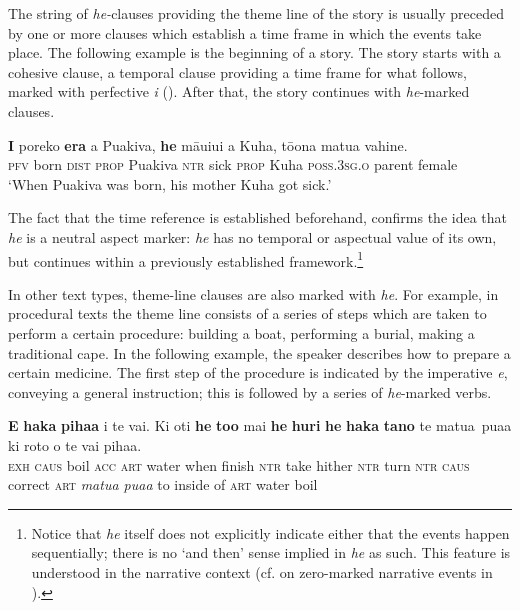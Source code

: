 The string of \textit{he-}clauses providing the theme line of the story is usually preceded by one or more clauses which establish a time frame in which the events take place. The following example is the beginning of a story. The story starts with a cohesive clause, a temporal clause providing a time frame for what follows, marked with perfective \textit{i} (). After that, the story continues with \textit{he}{}-marked clauses.

\ea\label{ex:7.4}
\gll \textbf{I} poreko \textbf{era} a Puakiva, \textbf{he} māuiui a Kuha, tō{\ꞌ}ona matu{\ꞌ}a vahine. \\
\textsc{pfv} born \textsc{dist} \textsc{prop} Puakiva \textsc{ntr} sick \textsc{prop} Kuha \textsc{poss.3sg.o} parent female \\

\glt
‘When Puakiva was born, his mother Kuha got sick.’ \textstyleExampleref{[R229.001]} 
\z

The fact that the time reference is established beforehand, confirms the idea that \textit{he} is a neutral aspect marker: \textit{he} has no temporal or aspectual value of its own, but continues within a previously established framework.\footnote{\label{fn:316}Notice that \textit{he} itself does not explicitly indicate either that the events happen sequentially; there is no ‘and then’ sense implied in \textit{he} as such. This feature is understood in the narrative context (cf. \citealt[127]{Hooper1998} on zero-marked narrative events in ).}

In other text types, theme-line clauses are also marked with \textit{he}. For example, in procedural texts the theme line consists of a series of steps which are taken to perform a certain procedure: building a boat, performing a burial, making a traditional cape. In the following example, the speaker describes how to prepare a certain medicine. The first step of the procedure is indicated by the imperative \textit{e}, conveying a general instruction; this is followed by a series of \textit{he}{}-marked verbs.

\ea\label{ex:7.5}
\gll \textbf{E} \textbf{haka} \textbf{piha{\ꞌ}a} i te vai. Ki oti \textbf{he} \textbf{to{\ꞌ}o} mai \textbf{he} \textbf{huri}  \textbf{he} \textbf{haka} \textbf{tano} te matu{\ꞌ}a~pua{\ꞌ}a ki roto o te vai piha{\ꞌ}a.\\
\textsc{exh} \textsc{caus} boil \textsc{acc} \textsc{art} water when finish \textsc{ntr} take hither \textsc{ntr} turn  \textsc{ntr} \textsc{caus} correct \textsc{art} \textit{matu{\ꞌ}a pua{\ꞌ}a} to inside of \textsc{art} water boil\\

